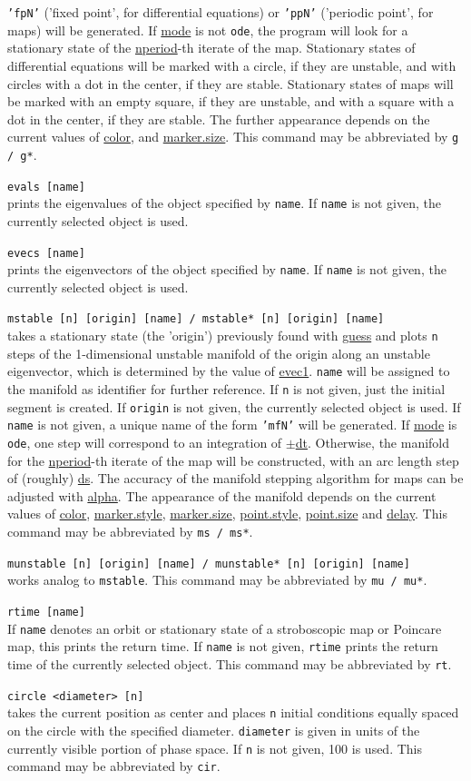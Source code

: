 \documentclass[10pt,a4paper,titlepage]{article}
\newcommand{\cmd}[2]{\item{\T{\hypertarget{#1}{#1}\index[index]{#1} #2}}}
\newcommand{\HL}[1]{\hyperlink{#1}{#1}}
\newcommand{\T}[1]{\texttt{#1}}
\begin{document}
\begin{description}
\T{'fpN'} ('fixed point', for differential equations) or \T{'ppN'} ('periodic point', for maps) will be generated. If \HL{mode} is not \T{ode}, the program will look for a stationary state of the \HL{nperiod}-th iterate of the map. Stationary states of differential equations will be marked with a circle, if they are unstable, and with circles with a dot in the center, if they are stable. Stationary states of maps will be marked with an empty square, if they are unstable, and with a square with a dot in the center, if they are stable. The further appearance depends on the current values of \HL{color}, and \HL{marker.size}. This command may be abbreviated by \T{g / g*}.
\cmd{evals}{[name]}\\
prints the eigenvalues of the object specified by \T{name}. If \T{name} is not given, the currently selected object is used.  
\cmd{evecs}{[name]}\\
prints the eigenvectors of the object specified by \T{name}. If \T{name} is not given, the currently selected object is used.  
\cmd{mstable}{[n] [origin] [name] / mstable* [n] [origin] [name]}\\takes a stationary state (the 'origin') previously found with \HL{guess} and plots \T{n} steps of the 1-dimensional unstable manifold of the origin along an unstable eigenvector, which is determined by the value of \HL{evec1}.  \T{name} will be assigned to the manifold as identifier for further reference. If \T{n} is not given, just the initial segment is created. If \T{origin} is not given, the currently selected object is used. If \T{name} is not given, a unique name of the form \T{'mfN'} will be generated. If \HL{mode} is \T{ode}, one step will correspond to an integration of $\pm$\HL{dt}. Otherwise, the manifold for the \HL{nperiod}-th iterate of the map will be constructed, with an arc length step of (roughly) \HL{ds}. The accuracy of the manifold stepping algorithm for maps can be adjusted with \HL{alpha}. The appearance of the manifold depends on the current values of \HL{color}, \HL{marker.style}, \HL{marker.size}, \HL{point.style}, \HL{point.size} and \HL{delay}. This command may be abbreviated by \T{ms / ms*}.
\cmd{munstable}{[n] [origin] [name] / munstable* [n] [origin] [name]}\\
works analog to \T{mstable}. This command may be abbreviated by \T{mu / mu*}.
\cmd{rtime}{[name]}\\
If \T{name} denotes an orbit or stationary state of a stroboscopic map or Poincare map, this prints the return time. If \T{name} is not given, \T{rtime} prints the return time of the currently selected object. This command may be abbreviated by \T{rt}.
\cmd{circle}{<diameter> [n]}\\
takes the current position as center and places \T{n} initial conditions equally spaced on the circle with the specified diameter. \T{diameter} is given in units of the currently visible portion of phase space. If \T{n} is not given, 100 is used. This command may be abbreviated by \T{cir}.
\end{description}
\end{document}
